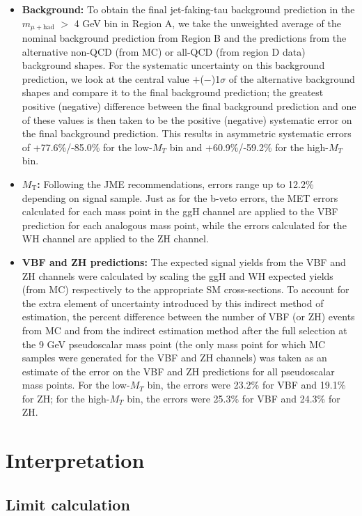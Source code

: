 \begin{itemize}
\item \textbf{Background: } To obtain the final jet-faking-tau background prediction in the $m_{\mu+\text{had}}$ $>$ 4 GeV bin in Region A, we take the unweighted average of the nominal background prediction from Region B and the predictions from the alternative non-QCD (from MC) or all-QCD (from region D data) background shapes. For the systematic uncertainty on this background prediction, we look at the central value $+$($-$)1$\sigma$ of the alternative background shapes and compare it to the final background prediction; the greatest positive (negative) difference between the final background prediction and one of these values is then taken to be the positive (negative) systematic error on the final background prediction. This results in asymmetric systematic errors of +77.6\%/-85.0\% for the low-$M_{T}$ bin and +60.9\%/-59.2\% for the high-$M_{T}$ bin.
\item \textbf{$M_{\text{T}}$: } Following the JME recommendations, errors range up to 12.2\% depending on signal sample. Just as for the b-veto errors, the MET errors calculated for each mass point in the ggH channel are applied to the VBF prediction for each analogous mass point, while the errors calculated for the WH channel are applied to the ZH channel.
\item \textbf{VBF and ZH predictions: } The expected signal yields from the VBF and ZH channels were calculated by scaling the ggH and WH expected yields (from MC) respectively to the appropriate SM cross-sections. To account for the extra element of uncertainty introduced by this indirect method of estimation, the percent difference between the number of VBF (or ZH) events from MC and from the indirect estimation method after the full selection at the 9 GeV pseudoscalar mass point (the only mass point for which MC samples were generated for the VBF and ZH channels) was taken as an estimate of the error on the VBF and ZH predictions for all pseudoscalar mass points. For the low-$M_{T}$ bin, the errors were 23.2\% for VBF and 19.1\% for ZH; for the high-$M_{T}$ bin, the errors were 25.3\% for VBF and 24.3\% for ZH.
\end{itemize}

\section{Interpretation\label{sec:results-interpretation}}

\subsection{Limit calculation\label{sec:results-limitcalc}}

